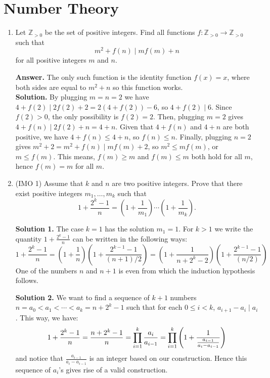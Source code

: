 \documentclass[11pt,a4paper]{article}
\begin{document}
\section*{Number Theory}
\begin{enumerate}
	\item [\textbf{N1}] Let $\mathbb{Z} _{>0}$ be the set of positive integers. Find all functions  $f: \mathbb{Z} _{>0}\rightarrow \mathbb{Z} _{>0}$ such that
	\[ m^2 + f(n) \mid mf(m) +n \]
	for all positive integers $m$ and $n$.
	
	\textbf{Answer.} The only such function is the identity function $f(x)=x$, where both sides are equal to $m^2+n$ so this function works. \\
	\textbf{Solution.} By plugging $m=n=2$ we have $4+f(2)\mid 2f(2)+2=2(4+f(2))-6$, so $4+f(2)\mid 6$. Since $f(2)>0$, the only possibility is $f(2)=2$. 
	Then, plugging $m=2$ gives $4+f(n)\mid 2f(2)+n=4+n$. Given that $4+f(n)$ and $4+n$ are both positive, we have $4+f(n)\le 4+n$, so $f(n)\le n$. 
	Finally, plugging $n=2$ gives $m^2+2=m^2+f(n)\mid mf(m)+2$, so $m^2\le mf(m)$, or $m\le f(m)$. 
	This means, $f(m)\ge m$ and $f(m)\le m$ both hold for all $m$, hence $f(m)=m$ for all $m$. 
	
	\item[\textbf{N2}] (IMO 1) Assume that $k$ and $n$ are two positive integers. Prove that there exist positive integers $m_1 , \dots , m_k$ such that \[1+\frac{2^k-1}{n}=\left(1+\frac1{m_1}\right)\cdots \left(1+\frac1{m_k}\right).\]
	
	\textbf{Solution 1.} 
	The case $k = 1$ has the solution $m_1 = 1$. For $k > 1$ we write the quantity $1+\frac{2^k-1}{n}$ can be written in the following ways: 
	\[
	1+\frac{2^k-1}{n} = \left(1 + \frac{1}{n}\right)\left(1 + \frac{2^{k-1} - 1}{(n + 1)/2}\right)
	= \left(1 + \frac{1}{n + 2^k - 2}\right)\left(1 + \frac{2^{k-1} - 1}{(n/2)}\right)
	\]
	One of the numbers $n$ and $n + 1$ is even from which the induction hypothesis follows. 
	
	\textbf{Solution 2.} We want to find a sequence of $k+1$ numbers $n=a_0<a_1<\cdots < a_k=n+2^k-1$ such that for each $0\le i<k$, $a_{i+1}-a_i\mid a_i$. This way, we have:
	\[
	1+\frac{2^k-1}{n}
	=\frac{n+2^k-1}{n}
	=\displaystyle\prod_{i=1}^k \frac{a_i}{a_{i-1}}
	=\displaystyle\prod_{i=1}^k\left(1 + \frac{1}{\frac{a_{i-1}}{a_i-a_{i-1}}}\right)
	\]
	and notice that $\frac{a_{i-1}}{a_i-a_{i-1}}$ is an integer based on our construction. Hence this sequence of $a_i$'s gives rise of a valid construction.
	

\end{enumerate}
\end{document}
